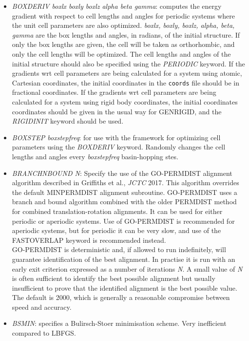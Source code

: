 \documentclass[12pt,a4paper,dvips]{article}
\begin{document}
\begin{itemize}
\item{\it BOXDERIV boxlx boxly boxlz alpha beta gamma\/}: computes the energy gradient with respect to cell lengths and angles
for periodic systems where the unit cell parameters are also optimized. {\it boxlx, boxly, boxlz, alpha, beta, gamma\/} are the
box lengths and angles, in radians, of the initial structure. If only the box lengths are given, the cell will be taken as 
orthorhombic, and only the cell lengths will be optimized. The cell lengths and angles of the initial structure should also
be specified using the {\it PERIODIC\/} keyword. If the gradients wrt cell parameters are being calculated for a system
using atomic, Cartesian coordinates, the initial coordinates in the {\tt coords} file should be in fractional coordinates. If
the gradients wrt cell parameters are being calculated for a system using rigid body coordinates, the initial coordinates
coordinates should be given in the usual way for GENRIGID, and the {\it RIGIDINIT\/} keyword should be used.

\item{\it BOXSTEP boxstepfreq\/}: for use with the framework for optimizing cell parameters using the {\it BOXDERIV\/} keyword.
Randomly changes the cell lengths and angles every {\it boxstepfreq\/} basin-hopping stes.

\item {\it BRANCHNBOUND N\/}: Specify the use of the GO-PERMDIST alignment algorithm described in Griffiths et al., {\it JCTC} 2017. This algorithm overrides the default MINPERMDIST alignment subroutine. GO-PERMDIST uses a branch and bound algorithm combined with the older PERMDIST method for combined translation-rotation alignments. It can be used for either periodic or aperiodic systems. Use of GO-PERMDIST is recommended for aperiodic systems, but for periodic it can be very slow, and use of the FASTOVERLAP keyword is recommended instead. \\
GO-PERMDIST is deterministic and, if allowed to run indefinitely, will guarantee identification of the best alignment. In practise it is run with an early exit criterion expressed as a number of iterations {\it N}. A small value of {\it N} is often sufficient to identify the best possible alignment but usually insufficient to prove that the identified alignment is the best possible value. The default is 2000, which is generally a reasonable compromise between speed and accuracy.

\item {\it BSMIN\/}: specifies a Bulirsch-Stoer minimisation scheme. 
Very inefficient compared to LBFGS.


\end{itemize}
\end{document}
